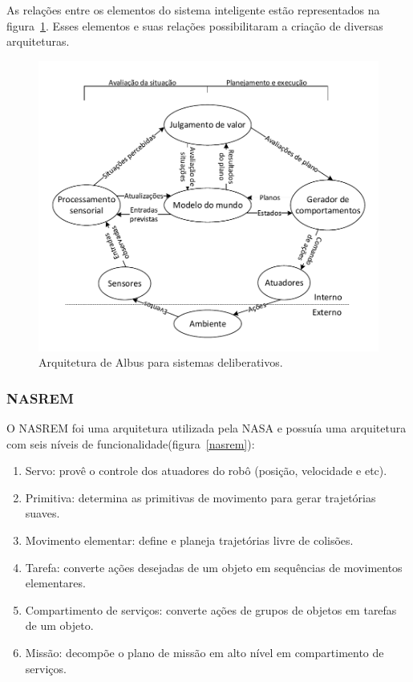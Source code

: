 As relações entre os elementos do sistema inteligente estão representados na
figura~\ref{albus}.  Esses elementos e suas relações possibilitaram a criação de
diversas arquiteturas.

\begin{figure}[H]
\centering
\includegraphics[width=1\columnwidth]{figs/albus.pdf}
\caption{Arquitetura de Albus para sistemas deliberativos.}
\label{albus}
\end{figure}


\subsubsection{NASREM}
O NASREM \cite{albus1989nasa} foi uma arquitetura utilizada pela
NASA e possuía uma arquitetura com seis níveis de
funcionalidade(figura~\ref{nasrem}):

\begin{enumerate}
  \item Servo: provê o controle dos atuadores do robô (posição, velocidade e
  etc).
  \item Primitiva: determina as primitivas de movimento para gerar trajetórias
  suaves.
  \item Movimento elementar: define e planeja trajetórias livre de colisões.
  \item Tarefa: converte ações desejadas de um objeto em sequências de
  movimentos elementares.
  \item Compartimento de serviços: converte ações de grupos de objetos em
  tarefas de um objeto.
  \item Missão: decompõe o plano de missão em alto nível em compartimento de
  serviços.
\end{enumerate}

